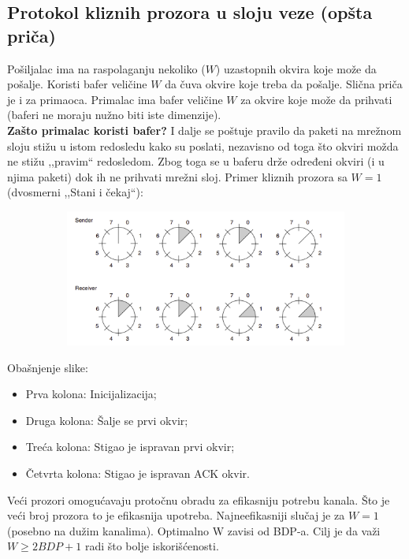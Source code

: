 \documentclass[a4paper]{article}
\begin{document}
    \subsection{Protokol kliznih prozora u sloju veze (opšta priča)}
        Pošiljalac ima na raspolaganju nekoliko ($W$) uzastopnih okvira koje može da pošalje. Koristi
        bafer veličine $W$ da čuva okvire koje treba da pošalje. Slična priča je i za primaoca. Primalac
        ima bafer veličine $W$ za okvire koje može da prihvati (baferi ne moraju nužno biti iste
        dimenzije). \\
        \indent \textbf{Zašto primalac koristi bafer?} I dalje se poštuje pravilo da paketi na mrežnom sloju
        stižu u istom redosledu kako su poslati, nezavisno od toga što okviri možda ne stižu ,,pravim``
        redosledom. Zbog toga se u baferu drže određeni okviri (i u njima paketi) dok ih ne prihvati
        mrežni sloj. Primer kliznih prozora sa $W = 1$ (dvosmerni ,,Stani i čekaj``):\\
        \begin{figure}[H]
            \begin{center}
                \includegraphics[width=120mm,height=45mm]{Slike/prozori1.png}
            \end{center}
        \end{figure}
        Obašnjenje slike: 
        \begin{itemize}
            \item Prva kolona: Inicijalizacija;
            \item Druga kolona: Šalje se prvi okvir;
            \item Treća kolona: Stigao je ispravan prvi okvir;
            \item Četvrta kolona: Stigao je ispravan ACK okvir.
        \end{itemize}
        Veći prozori omogućavaju protočnu obradu za efikasniju potrebu kanala. Što je veći
        broj prozora to je efikasnija upotreba. Najneefikasniji slučaj je za $W=1$ (posebno
        na dužim kanalima). Optimalno W zavisi od BDP-a. Cilj je da važi $W \geq 2BDP+1$ radi
        što bolje iskorišćenosti.
\end{document}
